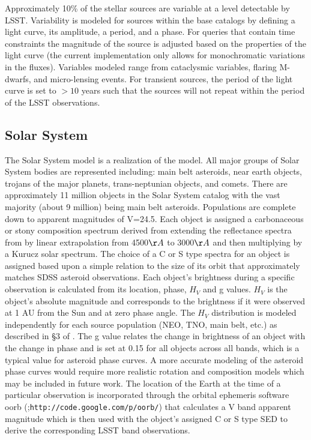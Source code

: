 \documentclass[11pt]{article}
\begin{document}
Approximately 10\% of the stellar sources are variable at a level
detectable by LSST.  Variability is modeled for sources within the
base catalogs by defining a light curve, its amplitude, a period, and
a phase. For queries that contain time constraints the magnitude of
the source is adjusted based on the properties of the light curve (the
current implementation only allows for monochromatic variations in the
fluxes). Variables modeled range from cataclysmic variables, flaring
M-dwarfs, and micro-lensing events. For transient sources, the period
of the light curve is set to $>10$ years such that the sources will
not repeat within the period of the LSST observations.


\subsection{Solar System \label{sec:ssm}}

The Solar System model is a realization of the \citet{grav11} model.
All major groups of Solar System bodies are represented including:
main belt asteroids, near earth objects, trojans of the major planets,
trans-neptunian objects, and comets. There are approximately 11
million objects in the Solar System catalog with the vast majority (about 9 million) being
main belt asteroids. Populations are complete down to apparent
magnitudes of V=24.5.  Each object is assigned a carbonaceous or stony
composition spectrum derived from extending the reflectance spectra
from \citet{demeo} by linear extrapolation from 4500$\AA$ to 3000$\AA$
and then multiplying by a Kurucz solar spectrum. The choice of a
C or S type spectra for an object is assigned based upon a simple
relation to the size of its orbit that approximately matches SDSS
asteroid observations. Each object's brightness during a specific
observation is calculated from its location, phase, $H_V$ and g
values. $H_V$ is the object's absolute magnitude and corresponds to the
brightness if it were observed at 1 AU from the Sun and at zero phase
angle.  The $H_V$ distribution is modeled independently for each
source population (NEO, TNO, main belt, etc.)  as described in \S 3 of
\citet{grav11}.  The g value relates the change in brightness of an
object with the change in phase and is set at 0.15 for all objects
across all bands, which is a typical value for asteroid phase curves.
A more accurate modeling of the asteroid phase curves would require
more realistic rotation and composition models which may be included
in future work.  The location of the Earth at the time of a
particular observation is incorporated through the orbital ephemeris software oorb
(\citet{granvik};{\tt http://code.google.com/p/oorb/}) that calculates a V
band apparent magnitude which is then used with the object's assigned
C or S type SED to derive the corresponding LSST band observations.
\end{document}
